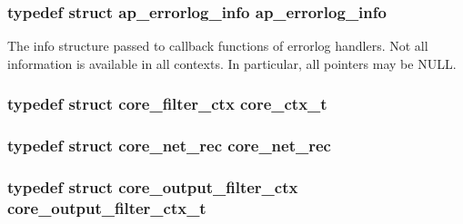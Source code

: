 \subsubsection[{\texorpdfstring{ap\+\_\+errorlog\+\_\+info}{ap_errorlog_info}}]{\setlength{\rightskip}{0pt plus 5cm}typedef struct {\bf ap\+\_\+errorlog\+\_\+info}  {\bf ap\+\_\+errorlog\+\_\+info}}\hypertarget{group__APACHE__CORE__HTTPD_ga76ce2aab695e109bbf222898e7240986}{}\label{group__APACHE__CORE__HTTPD_ga76ce2aab695e109bbf222898e7240986}
The info structure passed to callback functions of errorlog handlers. Not all information is available in all contexts. In particular, all pointers may be N\+U\+LL. 
\subsubsection[{\texorpdfstring{core\+\_\+ctx\+\_\+t}{core_ctx_t}}]{\setlength{\rightskip}{0pt plus 5cm}typedef struct {\bf core\+\_\+filter\+\_\+ctx} {\bf core\+\_\+ctx\+\_\+t}}\hypertarget{group__APACHE__CORE__HTTPD_ga9d058483cac7066cb341b504b16b6ada}{}\label{group__APACHE__CORE__HTTPD_ga9d058483cac7066cb341b504b16b6ada}
\subsubsection[{\texorpdfstring{core\+\_\+net\+\_\+rec}{core_net_rec}}]{\setlength{\rightskip}{0pt plus 5cm}typedef struct {\bf core\+\_\+net\+\_\+rec}  {\bf core\+\_\+net\+\_\+rec}}\hypertarget{group__APACHE__CORE__HTTPD_ga1f169914bc5f5088bd57760a13b54f7b}{}\label{group__APACHE__CORE__HTTPD_ga1f169914bc5f5088bd57760a13b54f7b}
\subsubsection[{\texorpdfstring{core\+\_\+output\+\_\+filter\+\_\+ctx\+\_\+t}{core_output_filter_ctx_t}}]{\setlength{\rightskip}{0pt plus 5cm}typedef struct {\bf core\+\_\+output\+\_\+filter\+\_\+ctx} {\bf core\+\_\+output\+\_\+filter\+\_\+ctx\+\_\+t}}\hypertarget{group__APACHE__CORE__HTTPD_gadbd89ce394d25002077122416b3c889c}{}\label{group__APACHE__CORE__HTTPD_gadbd89ce394d25002077122416b3c889c}
